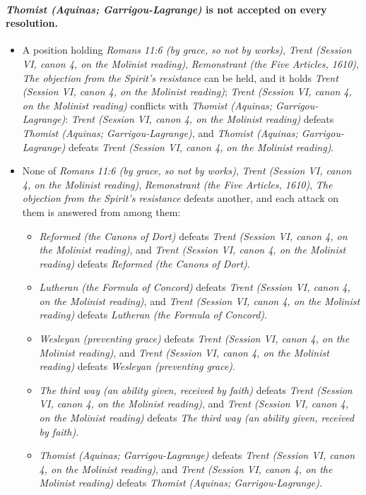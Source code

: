 \documentclass[11pt]{article}
\begin{document}
\paragraph{\emph{Thomist (Aquinas; Garrigou-Lagrange)} is not accepted on every resolution.}
\begin{itemize}
\item A position holding \emph{Romans 11:6 (by grace, so not by works)}, \emph{Trent (Session VI, canon 4, on the Molinist reading)}, \emph{Remonstrant (the Five Articles, 1610)}, \emph{The objection from the Spirit’s resistance} can be held, and it holds \emph{Trent (Session VI, canon 4, on the Molinist reading)}; \emph{Trent (Session VI, canon 4, on the Molinist reading)} conflicts with \emph{Thomist (Aquinas; Garrigou-Lagrange)}: \emph{Trent (Session VI, canon 4, on the Molinist reading)} defeats \emph{Thomist (Aquinas; Garrigou-Lagrange)}, and \emph{Thomist (Aquinas; Garrigou-Lagrange)} defeats \emph{Trent (Session VI, canon 4, on the Molinist reading)}.
\item None of \emph{Romans 11:6 (by grace, so not by works)}, \emph{Trent (Session VI, canon 4, on the Molinist reading)}, \emph{Remonstrant (the Five Articles, 1610)}, \emph{The objection from the Spirit’s resistance} defeats another, and each attack on them is answered from among them:
\begin{itemize}
\item \emph{Reformed (the Canons of Dort)} defeats \emph{Trent (Session VI, canon 4, on the Molinist reading)}, and \emph{Trent (Session VI, canon 4, on the Molinist reading)} defeats \emph{Reformed (the Canons of Dort)}.
\item \emph{Lutheran (the Formula of Concord)} defeats \emph{Trent (Session VI, canon 4, on the Molinist reading)}, and \emph{Trent (Session VI, canon 4, on the Molinist reading)} defeats \emph{Lutheran (the Formula of Concord)}.
\item \emph{Wesleyan (preventing grace)} defeats \emph{Trent (Session VI, canon 4, on the Molinist reading)}, and \emph{Trent (Session VI, canon 4, on the Molinist reading)} defeats \emph{Wesleyan (preventing grace)}.
\item \emph{The third way (an ability given, received by faith)} defeats \emph{Trent (Session VI, canon 4, on the Molinist reading)}, and \emph{Trent (Session VI, canon 4, on the Molinist reading)} defeats \emph{The third way (an ability given, received by faith)}.
\item \emph{Thomist (Aquinas; Garrigou-Lagrange)} defeats \emph{Trent (Session VI, canon 4, on the Molinist reading)}, and \emph{Trent (Session VI, canon 4, on the Molinist reading)} defeats \emph{Thomist (Aquinas; Garrigou-Lagrange)}.

\end{itemize}
\end{itemize}
\end{document}
